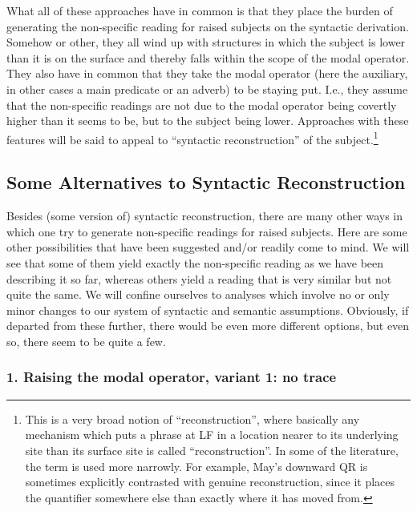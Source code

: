 What all of these approaches have in common is that they place the burden of generating the non-specific reading for raised subjects on the syntactic derivation. Somehow or other, they all wind up with structures in which the subject is lower than it is on the surface and thereby falls within the scope of the modal operator. They also have in common that they take the modal operator (here the auxiliary, in other cases a main predicate or an adverb) to be staying put. I.e., they assume that the non-specific readings are not due to the modal operator being covertly higher than it seems to be, but to the subject being lower. Approaches with these features will be said to appeal to ``syntactic reconstruction'' of the subject.\footnote{This is a very broad notion of ``reconstruction'', where basically any mechanism which puts a phrase at LF in a location nearer to its underlying site than its surface site is called ``reconstruction''. In some of the literature, the term is used more narrowly. For example, May's downward QR is sometimes explicitly contrasted with genuine reconstruction, since it places the quantifier somewhere else than exactly where it has moved from. }

\subsection{Some Alternatives to Syntactic Reconstruction}\label{sem}

Besides (some version of) syntactic reconstruction, there are many other ways in which one try to generate non-specific readings for raised subjects. Here are some other possibilities that have been suggested and/or readily come to mind. We will see that some of them yield exactly the non-specific reading as we have been describing it so far, whereas others yield a reading that is very similar but not quite the same. We will confine ourselves to analyses which involve no or only minor changes to our system of syntactic and semantic assumptions. Obviously, if departed from these further, there would be even more different options, but even so, there seem to be quite a few.

\subsubsection{1. Raising the modal operator, variant 1: no trace}

